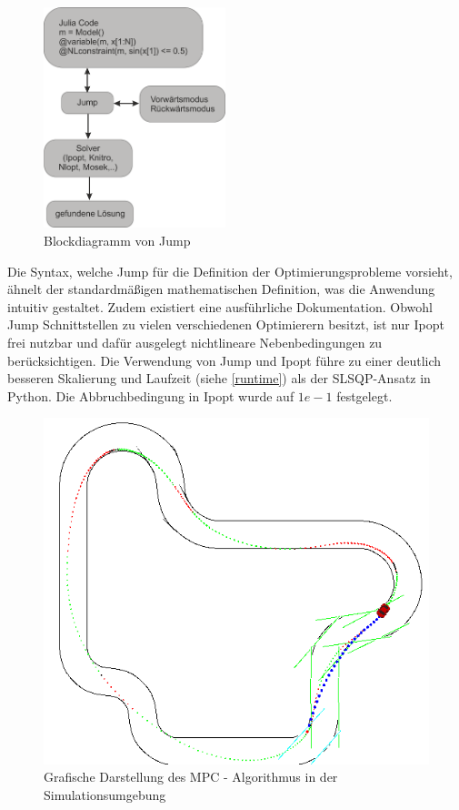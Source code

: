\documentclass{like}
\begin{document}
\begin{figure}[ht!]
	\centering
	\includegraphics[width=150pt]{Abbildungen/jumpDiagram.png}
	\caption{Blockdiagramm von \ac{Jump}}
	\label{fig:jumpDiagram}
\end{figure}

Die Syntax, welche \ac{Jump} für die Definition der Optimierungsprobleme vorsieht, ähnelt der standardmäßigen mathematischen Definition, was die Anwendung intuitiv gestaltet. Zudem existiert eine ausführliche Dokumentation.
Obwohl \ac{Jump} Schnittstellen zu vielen verschiedenen Optimierern besitzt, ist nur \ac{Ipopt} frei nutzbar und dafür ausgelegt nichtlineare Nebenbedingungen zu berücksichtigen. Die Verwendung von \ac{Jump} und \ac{Ipopt} führe zu einer deutlich besseren Skalierung und Laufzeit (siehe \ref{runtime}) als der \ac{SLSQP}-Ansatz in Python. Die Abbruchbedingung in \ac{Ipopt} wurde auf $1e-1$ festgelegt.



\begin{figure}[ht!]
	\centering
	\includegraphics[width=350pt]{Abbildungen/sim_visual.png}
	\caption{Grafische Darstellung des MPC - Algorithmus in der Simulationsumgebung}
	\label{fig:jumpDiagram}
\end{figure}
\end{document}
